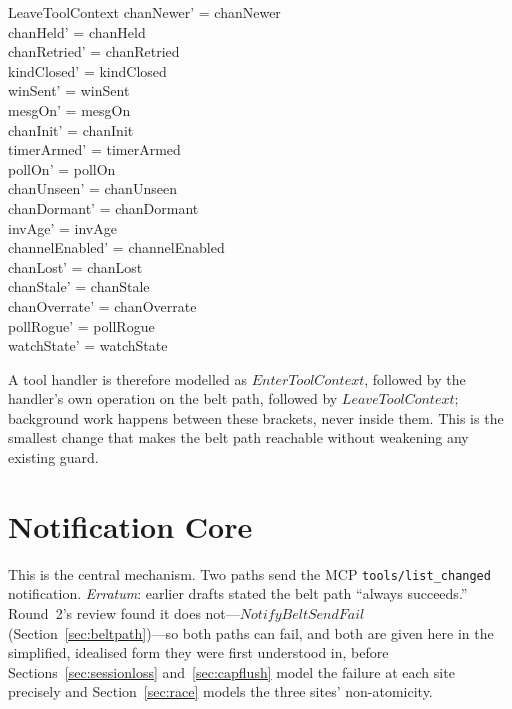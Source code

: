 \documentclass[a4paper,10pt,fleqn]{article}
\begin{document}
\begin{schema}{LeaveToolContext}
  chanNewer' = chanNewer \\
  chanHeld' = chanHeld \\
  chanRetried' = chanRetried \\
  kindClosed' = kindClosed \\
  winSent' = winSent \\
  mesgOn' = mesgOn \\
  chanInit' = chanInit \\
  timerArmed' = timerArmed \\
  pollOn' = pollOn \\
  chanUnseen' = chanUnseen \\
  chanDormant' = chanDormant \\
  invAge' = invAge \\
  channelEnabled' = channelEnabled \\
  chanLost' = chanLost \\
  chanStale' = chanStale \\
  chanOverrate' = chanOverrate \\
  pollRogue' = pollRogue \\
  watchState' = watchState
\end{schema}

A tool handler is therefore modelled as $EnterToolContext$, followed by
the handler's own operation on the belt path, followed by
$LeaveToolContext$; background work happens between these brackets, never
inside them.  This is the smallest change that makes the belt path
reachable without weakening any existing guard.

\section{Notification Core}
\label{sec:notifycore}

This is the central mechanism.  Two paths send the MCP
\texttt{tools/list\_changed} notification.  \emph{Erratum}: earlier
drafts stated the belt path ``always succeeds.''  Round~2's review
found it does not---$NotifyBeltSendFail$
(Section~\ref{sec:beltpath})---so both paths can fail, and both are
given here in the simplified, idealised form they were first
understood in, before Sections~\ref{sec:sessionloss}
and~\ref{sec:capflush} model the failure at each site precisely and
Section~\ref{sec:race} models the three sites' non-atomicity.
\end{document}
